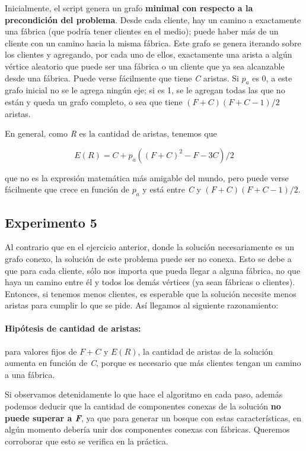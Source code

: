\documentclass[a4paper]{report}
\begin{document}
Inicialmente, el script genera un grafo \textbf{minimal con respecto a la precondición del problema}. Desde cada cliente, hay un camino a exactamente una fábrica (que podría tener clientes en el medio); puede haber más de un cliente con un camino hacia la misma fábrica. Este grafo se genera iterando sobre los clientes y agregando, por cada uno de ellos, exactamente una arista a algún vértice aleatorio que puede ser una fábrica o un cliente que ya sea alcanzable desde una fábrica. Puede verse fácilmente que tiene \textit{C} aristas. Si $p_{a}$ es 0, a este grafo inicial no se le agrega ningún eje; si es 1, se le agregan todas las que no están y queda un grafo completo, o sea que tiene $(F+C) (F+C-1) / 2$ aristas. 

En general, como \textit{R} es la cantidad de aristas, tenemos que

$$
E(R) = C + p_{a} ((F+C)^2 - F - 3C)/2
$$

que no es la expresión matemática más amigable del mundo, pero puede verse fácilmente que crece en función de $p_{a}$ y está entre \textit{C} y $(F+C) (F+C-1) / 2$.

\subsection{Experimento 5}

Al contrario que en el ejercicio anterior, donde la solución necesariamente es un grafo conexo, la solución de este problema puede ser no conexa. Esto se debe a que para cada cliente, sólo nos importa que pueda llegar a alguna fábrica, no que haya un camino entre él y todos los demás vértices (ya sean fábricas o clientes). Entonces, si tenemos menos clientes, es esperable que la solución necesite menos aristas para cumplir lo que se pide. Así llegamos al siguiente razonamiento:

\paragraph{Hipótesis de cantidad de aristas: } para valores fijos de $F + C$ y $E(R)$, la cantidad de aristas de la solución aumenta en función de \textit{C}, porque es necesario que más clientes tengan un camino a una fábrica.

\medskip

Si observamos detenidamente lo que hace el algoritmo en cada paso, además podemos deducir que la cantidad de componentes conexas de la solución \textbf{no puede superar a \textit{F}}, ya que para generar un bosque con estas características, en algún momento debería unir dos componentes conexas con fábricas. Queremos corroborar que esto se verifica en la práctica.
\end{document}
